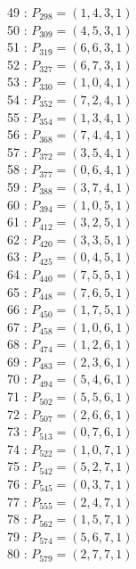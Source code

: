 \documentclass{article}
\begin{document}
{\begin{multicols}{3}
49 : $P_{298}=( 1, 4, 3, 1 )$\\
50 : $P_{309}=( 4, 5, 3, 1 )$\\
51 : $P_{319}=( 6, 6, 3, 1 )$\\
52 : $P_{327}=( 6, 7, 3, 1 )$\\
53 : $P_{330}=( 1, 0, 4, 1 )$\\
54 : $P_{352}=( 7, 2, 4, 1 )$\\
55 : $P_{354}=( 1, 3, 4, 1 )$\\
56 : $P_{368}=( 7, 4, 4, 1 )$\\
57 : $P_{372}=( 3, 5, 4, 1 )$\\
58 : $P_{377}=( 0, 6, 4, 1 )$\\
59 : $P_{388}=( 3, 7, 4, 1 )$\\
60 : $P_{394}=( 1, 0, 5, 1 )$\\
61 : $P_{412}=( 3, 2, 5, 1 )$\\
62 : $P_{420}=( 3, 3, 5, 1 )$\\
63 : $P_{425}=( 0, 4, 5, 1 )$\\
64 : $P_{440}=( 7, 5, 5, 1 )$\\
65 : $P_{448}=( 7, 6, 5, 1 )$\\
66 : $P_{450}=( 1, 7, 5, 1 )$\\
67 : $P_{458}=( 1, 0, 6, 1 )$\\
68 : $P_{474}=( 1, 2, 6, 1 )$\\
69 : $P_{483}=( 2, 3, 6, 1 )$\\
70 : $P_{494}=( 5, 4, 6, 1 )$\\
71 : $P_{502}=( 5, 5, 6, 1 )$\\
72 : $P_{507}=( 2, 6, 6, 1 )$\\
73 : $P_{513}=( 0, 7, 6, 1 )$\\
74 : $P_{522}=( 1, 0, 7, 1 )$\\
75 : $P_{542}=( 5, 2, 7, 1 )$\\
76 : $P_{545}=( 0, 3, 7, 1 )$\\
77 : $P_{555}=( 2, 4, 7, 1 )$\\
78 : $P_{562}=( 1, 5, 7, 1 )$\\
79 : $P_{574}=( 5, 6, 7, 1 )$\\
80 : $P_{579}=( 2, 7, 7, 1 )$\\
\end{multicols}


%


%


}%
\end{document}
